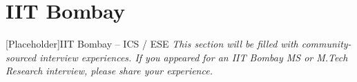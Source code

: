 \section{IIT Bombay}
\label{sec:exp-iitb}

\begin{experience}{[Placeholder]}{IIT Bombay -- ICS / ESE}
  \textit{This section will be filled with community-sourced interview
  experiences. If you appeared for an IIT Bombay MS or M.Tech Research
  interview, please share your experience.}
\end{experience}

